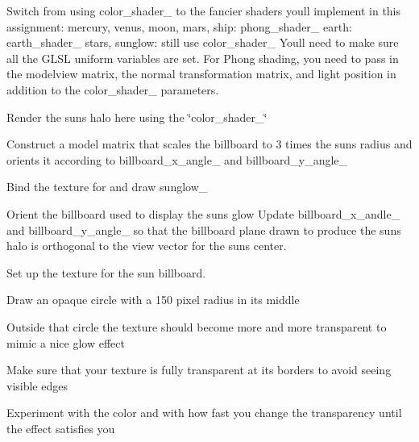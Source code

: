 
\begin{DoxyRefList}
\item[\label{todo__todo000002}%
\hypertarget{todo__todo000002}{}%
Member \hyperlink{classSolar__viewer_af6b468fb543b9c9ed466fe1687f1aff8}{Solar\+\_\+viewer\+:\+:draw\+\_\+scene} (\hyperlink{classmat4}{mat4} \&\+\_\+projection, \hyperlink{classmat4}{mat4} \&\+\_\+view)]Switch from using color\+\_\+shader\+\_\+ to the fancier shaders you\textquotesingle{}ll implement in this assignment\+: mercury, venus, moon, mars, ship\+: phong\+\_\+shader\+\_\+ earth\+: earth\+\_\+shader\+\_\+ stars, sunglow\+: still use color\+\_\+shader\+\_\+ You\textquotesingle{}ll need to make sure all the G\+L\+SL uniform variables are set. For Phong shading, you need to pass in the modelview matrix, the normal transformation matrix, and light position in addition to the color\+\_\+shader\+\_\+ parameters. 

Render the sun\textquotesingle{}s halo here using the \char`\"{}color\+\_\+shader\+\_\+\char`\"{}
\begin{DoxyItemize}
\item Construct a model matrix that scales the billboard to 3 times the sun\textquotesingle{}s radius and orients it according to billboard\+\_\+x\+\_\+angle\+\_\+ and billboard\+\_\+y\+\_\+angle\+\_\+
\item Bind the texture for and draw sunglow\+\_\+  
\end{DoxyItemize}
\item[\label{todo__todo000001}%
\hypertarget{todo__todo000001}{}%
Member \hyperlink{classSolar__viewer_ab0c48ceb8d58aefee8c5528c9efa6412}{Solar\+\_\+viewer\+:\+:paint} ()]Orient the billboard used to display the sun\textquotesingle{}s glow Update billboard\+\_\+x\+\_\+andle\+\_\+ and billboard\+\_\+y\+\_\+angle\+\_\+ so that the billboard plane drawn to produce the sun\textquotesingle{}s halo is orthogonal to the view vector for the sun\textquotesingle{}s center.  
\item[\label{todo__todo000004}%
\hypertarget{todo__todo000004}{}%
Member \hyperlink{classTexture_a124fe8f7960fad810b68e3d4f5870cbe}{Texture\+:\+:create\+Sun\+Billboard\+Texture} ()]Set up the texture for the sun billboard.
\begin{DoxyItemize}
\item Draw an opaque circle with a 150 pixel radius in its middle
\item Outside that circle the texture should become more and more transparent to mimic a nice glow effect
\item Make sure that your texture is fully transparent at its borders to avoid seeing visible edges
\item Experiment with the color and with how fast you change the transparency until the effect satisfies you 
\end{DoxyItemize}
\end{DoxyRefList}